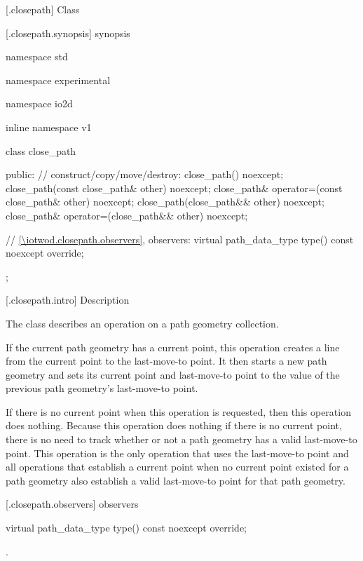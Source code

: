  [\iotwod.closepath] {Class }

 [\iotwod.closepath.synopsis] { synopsis}

\begin{codeblock}
namespace std { namespace experimental { namespace io2d { inline namespace v1 {
  class close_path {
  public:
    // construct/copy/move/destroy:
    close_path() noexcept;
    close_path(const close_path& other) noexcept;
    close_path& operator=(const close_path& other) noexcept;
    close_path(close_path&& other) noexcept;
    close_path& operator=(close_path&& other) noexcept;

    // \ref{\iotwod.closepath.observers}, observers:
    virtual path_data_type type() const noexcept override;
  };
} } } }
\end{codeblock}

 [\iotwod.closepath.intro] { Description}

\pnum
{}
The class  describes an operation on a path geometry collection.

\pnum
If the current path geometry has a current point, this operation creates a line from the current point to the last-move-to point. It then starts a new path geometry and sets its current point and last-move-to point to the value of the previous path geometry's last-move-to point.

\pnum
If there is no current point when this operation is requested, then this operation does nothing.
\enternote
Because this operation does nothing if there is no current point, there is no need to track whether or not a path geometry has a valid last-move-to point. This operation is the only operation that uses the last-move-to point and all operations that establish a current point when no current point existed for a path geometry also establish a valid last-move-to point for that path geometry.
\exitnote

 [\iotwod.closepath.observers]{ observers}

\begin{itemdecl}
    virtual path_data_type type() const noexcept override;
\end{itemdecl}
\begin{itemdescr}
	\pnum
	\returns
	.

\end{itemdescr}
